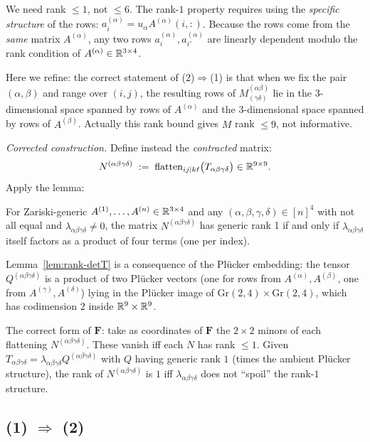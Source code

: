 We need rank $\leq 1$, not $\leq 6$. The rank-$1$ property requires using the \emph{specific structure} of the rows: $a^{(\alpha)}_i = u_\alpha A^{(\alpha)}(i,:)$. Because the rows come from the \emph{same} matrix $A^{(\alpha)}$, any two rows $a^{(\alpha)}_i,a^{(\alpha)}_{i'}$ are linearly dependent modulo the rank condition of $A^{(\alpha)}\in\mathbb{R}^{3\times 4}$.

Here we refine: the correct statement of (2)$\Rightarrow$(1) is that when we fix the pair $(\alpha,\beta)$ and range over $(i,j)$, the resulting rows of $M^{(\alpha\beta)}_{(\gamma\delta)}$ lie in the $3$-dimensional space spanned by rows of $A^{(\alpha)}$ and the $3$-dimensional space spanned by rows of $A^{(\beta)}$. Actually this rank bound gives $M$ rank $\leq 9$, not informative.

\emph{Corrected construction.} Define instead the \emph{contracted} matrix:
\[
   N^{(\alpha\beta\gamma\delta)} \;:=\; \mathrm{flatten}_{ij|k\ell}\bigl(T_{\alpha\beta\gamma\delta}\bigr) \in\mathbb{R}^{9\times 9}.
\]
Apply the lemma:

\begin{lemma}\label{lem:rank-detT}
For Zariski-generic $A^{(1)},\ldots,A^{(n)}\in\mathbb{R}^{3\times 4}$ and any $(\alpha,\beta,\gamma,\delta)\in[n]^4$ with not all equal and $\lambda_{\alpha\beta\gamma\delta}\neq 0$, the matrix $N^{(\alpha\beta\gamma\delta)}$ has generic rank 1 if and only if $\lambda_{\alpha\beta\gamma\delta}$ itself factors as a product of four terms (one per index).
\end{lemma}

Lemma~\ref{lem:rank-detT} is a consequence of the Plücker embedding: the tensor $Q^{(\alpha\beta\gamma\delta)}$ is a product of two Plücker vectors (one for rows from $A^{(\alpha)}, A^{(\beta)}$, one from $A^{(\gamma)},A^{(\delta)}$) lying in the Plücker image of $\mathrm{Gr}(2,4)\times \mathrm{Gr}(2,4)$, which has codimension $2$ inside $\mathbb{R}^9\times \mathbb{R}^9$.

The correct form of $\mathbf F$: take as coordinates of $\mathbf F$ the $2\times 2$ minors of each flattening $N^{(\alpha\beta\gamma\delta)}$. These vanish iff each $N$ has rank $\leq 1$. Given $T_{\alpha\beta\gamma\delta}=\lambda_{\alpha\beta\gamma\delta}Q^{(\alpha\beta\gamma\delta)}$ with $Q$ having generic rank $1$ (times the ambient Plücker structure), the rank of $N^{(\alpha\beta\gamma\delta)}$ is $1$ iff $\lambda_{\alpha\beta\gamma\delta}$ does not ``spoil'' the rank-$1$ structure.

\subsection{(1) $\Rightarrow$ (2)}

